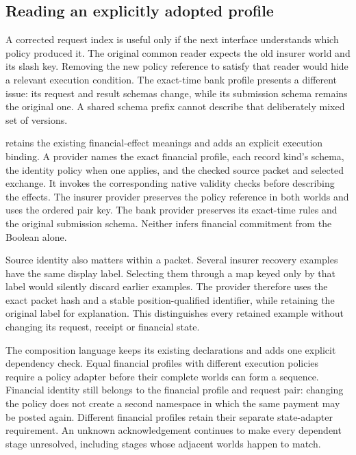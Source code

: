 \subsection{Reading an explicitly adopted profile}
\label{sec:adopted-profile-effects}

A corrected request index is useful only if the next interface understands
which policy produced it. The original common reader expects the old insurer
world and its slash key. Removing the new policy reference to satisfy that
reader would hide a relevant execution condition. The exact-time bank profile
presents a different issue: its request and result schemas change, while its
submission schema remains the original one. A shared schema prefix cannot
describe that deliberately mixed set of versions.

 retains the existing financial-effect meanings and
adds an explicit execution binding. A provider names the exact financial
profile, each record kind's schema, the identity policy when one applies, and
the checked source packet and selected exchange. It invokes the corresponding
native validity checks before describing the effects. The insurer provider
preserves the policy reference in both worlds and uses the ordered pair key.
The bank provider preserves its exact-time rules and the original submission
schema. Neither infers financial commitment from the Boolean alone.

Source identity also matters within a packet. Several insurer recovery examples
have the same display label. Selecting them through a map keyed only by that
label would silently discard earlier examples. The provider therefore uses the
exact packet hash and a stable position-qualified identifier, while retaining
the original label for explanation. This distinguishes every retained example
without changing its request, receipt or financial state.

The composition language keeps its existing declarations and adds one explicit
dependency check. Equal financial profiles with different execution policies
require a policy adapter before their complete worlds can form a sequence.
Financial identity still belongs to the financial profile and request pair:
changing the policy does not create a second namespace in which the same
payment may be posted again. Different financial profiles retain their separate
state-adapter requirement. An unknown acknowledgement continues to make every
dependent stage unresolved, including stages whose adjacent worlds happen to
match.

